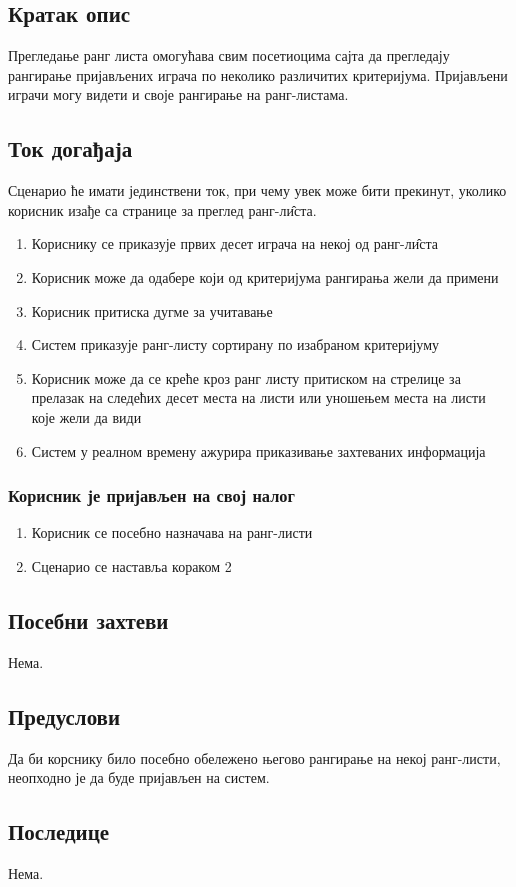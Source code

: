 \subsection{Кратак опис}
Прегледање ранг листа омогућава свим посетиоцима сајта да прегледају рангирање
пријављених играча по неколико различитих критеријума. Пријављени играчи могу видети и
своје рангирање на ранг-листама.

\subsection{Ток догађаја}
Сценарио ће имати јединствени ток, при чему увек може бити прекинут, уколико корисник
изађе са странице за преглед ранг-л\^{и}ста.

\begin{enumerate}
	\item Кориснику се приказује првих десет играча на некој од ранг-л\^{и}ста
	\item Корисник може да одабере који од критеријума рангирања жели да примени 
	\item Корисник притиска дугме за учитавање
	\item Систем приказује ранг-листу сортирану по изабраном критеријуму
	\item Корисник може да се креће кроз ранг листу притиском на стрелице за прелазак на
	      следећих десет места на листи или уношењем места на листи које жели да види
	\item Систем у реалном времену ажурира приказивање захтеваних информација
\end{enumerate}

\subsubsection{Корисник је пријављен на свој налог}
\begin{enumerate}[label=1.\arabic*]
	\item Корисник се посебно назначава на ранг-листи
	\item Сценарио се наставља кораком 2
\end{enumerate}

\subsection{Посебни захтеви}
Нема.

\subsection{Предуслови}
Да би корснику било посебно обележено његово рангирање на некој ранг-листи, неопходно је
да буде пријављен на систем. 

\subsection{Последице}
Нема.
